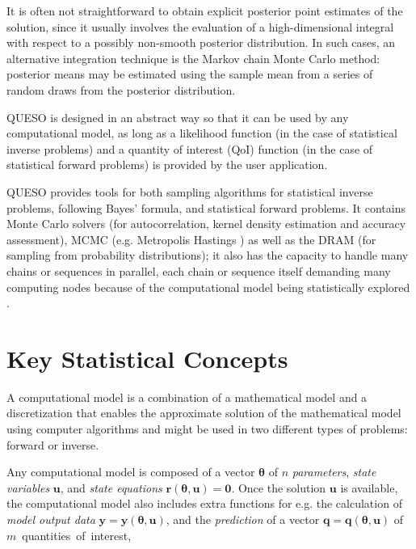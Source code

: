 It is often not straightforward to obtain explicit posterior point estimates of the solution, since it usually involves the evaluation of a high-dimensional integral with respect to a possibly non-smooth posterior distribution. In such cases, an alternative integration technique is the Markov chain Monte Carlo method: posterior means may be estimated using the sample mean from a series of random draws from the posterior distribution.

QUESO is designed in an abstract way so that it can be used by any computational model, as long as a likelihood function (in the case of statistical inverse problems) and a quantity of interest (QoI) function (in the case of statistical forward problems) is provided by the user application.

QUESO provides tools for both sampling algorithms for statistical inverse problems, following Bayes' formula, and statistical forward problems. It contains Monte Carlo solvers (for autocorrelation, kernel density estimation and accuracy assessment), MCMC (e.g. Metropolis Hastings \cite{Metr_1953,Hast_1970}) as well as the DRAM \cite{HaLaMiSa06} (for sampling from probability distributions); it also has the capacity to handle many chains or sequences in parallel, each chain or sequence itself demanding many computing nodes because of the computational model being statistically explored \cite{PrSc09}.

\section{Key Statistical Concepts}\label{sec:statistical_concepts}

A computational model is a combination of a
mathematical model and a discretization that enables the approximate
solution of the mathematical model using computer algorithms and  might be used in two different types of problems:
forward or inverse. 

Any computational model is composed of a vector $\boldsymbol{\theta}$ of $n$ {\it parameters}, {\it state variables} $\mathbf{u}$, and {\it state equations} $\mathbf{r}(\boldsymbol{\theta},\mathbf{u}) = \mathbf{0}$.
Once the solution $\mathbf{u}$ is available, the computational model also includes extra functions for e.g.
the calculation of {\it model output data} $\mathbf{y} = \mathbf{y}(\boldsymbol{\theta},\mathbf{u})$, and the {\it prediction} of a
vector $\mathbf{q} = \mathbf{q}(\boldsymbol{\theta},\mathbf{u})$ of $m$~quantities~of~interest,


